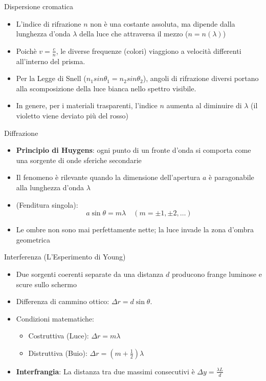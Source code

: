 
\begin{frame}{Dispersione cromatica}
    \begin{itemize}
        \item L'indice di rifrazione $n$ non è una costante assoluta, ma dipende dalla lunghezza d'onda $\lambda$ della luce che attraversa il mezzo ($n = n(\lambda)$)
        \item Poichè $v=\frac{c}{n}$, le diverse frequenze (colori) viaggiono a velocità differenti all'interno del prisma.
        \item Per la Legge di Snell ($n_1sin\theta_1 = n_2sin\theta_2$), angoli di rifrazione diversi portano alla scomposizione della luce bianca nello spettro visibile.
        \item In genere, per i materiali trasparenti, l'indice $n$ aumenta al diminuire di $\lambda$ (il violetto viene deviato più del rosso)
    \end{itemize}
\end{frame}

\begin{frame}{Diffrazione}
    \begin{itemize}
        \item \textbf{Principio di Huygens}: ogni punto di un fronte d'onda si comporta come una sorgente di onde sferiche secondarie
        \item Il fenomeno è rilevante quando la dimensione dell'apertura $a$ è paragonabile alla lunghezza d'onda $\lambda$
        \item (Fenditura singola):$$a \sin \theta = m\lambda \quad (m = \pm 1, \pm 2, \dots)$$
        \item Le ombre non sono mai perfettamente nette; la luce invade la zona d'ombra geometrica
    \end{itemize}
\end{frame}


\begin{frame}{Interferenza (L'Esperimento di Young)}
    \begin{itemize}
        \item Due sorgenti coerenti separate da una distanza $d$ producono frange luminose e scure sullo schermo
        \item Differenza di cammino ottico: $\Delta r = d \sin \theta$.
        \item Condizioni matematiche:
        \begin{itemize}
            \item Costruttiva (Luce): $\Delta r = m\lambda$
            \item Distruttiva (Buio): $\Delta r = (m + \frac{1}{2})\lambda$
        \end{itemize}
        \item \textbf{Interfrangia}: La distanza tra due massimi consecutivi è $\Delta y = \frac{\lambda L}{d}$
    \end{itemize}
\end{frame}

